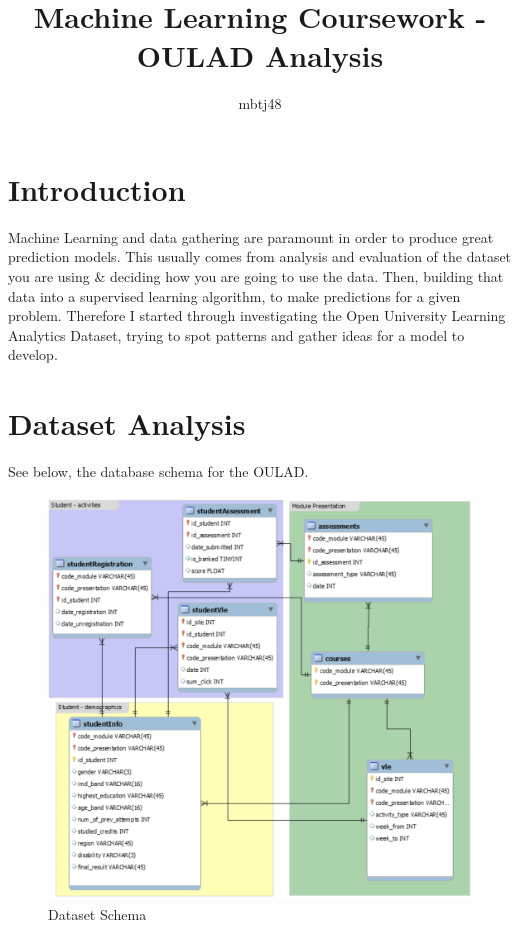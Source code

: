 \documentclass[11pt, a4paper, twocolumn]{article}
\title{\vspace{-1.25cm}Machine Learning Coursework - OULAD Analysis}
\author{mbtj48}
\date{}
\begin{document}
\maketitle

\section{Introduction}

Machine Learning and data gathering are paramount in order to produce great prediction models. This usually comes from analysis and evaluation of the dataset you are using \& deciding how you are going to use the data.
Then, building that data into a supervised learning algorithm, to make predictions for a given problem.
Therefore I started through investigating the Open University Learning Analytics Dataset, trying to spot patterns and gather ideas for a model to develop.

\section{Dataset Analysis}

See below, the database schema for the OULAD.
\begin{figure}[H]
	\includegraphics[width=\linewidth]{dataset.png} 
	\caption{Dataset Schema}
	\label{fig:schema}
\end{figure}
\end{document}
